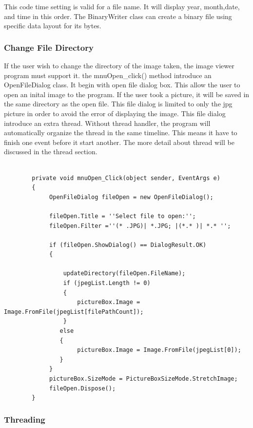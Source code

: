 \documentclass[oneside]{ecsgdp}         %
\begin{document}
            This code time setting is valid for a file name. It will display year, month,date, and time in this order. The BinaryWriter class can create a binary file using specific data layout for its bytes. 

\subsubsection*{Change File Directory}
If the user wish to change the directory of the image taken, the image viewer program must support it. the mnuOpen\_click() method introduce an OpenFileDialog class. It begin with open file dialog box. This allow the user to open an inital image to the program. If the user took a picture, it will be saved in the same directory as the open file. This file dialog is limited to only the jpg picture in order to avoid the error of displaying the image. 
This file dialog introduce an extra thread. Without thread handler, the program will automatically organize the thread in the same timeline. This means it have to finish one event before it start another. The more detail about thread will be discussed in the thread section. 
\begin{lstlisting}[caption={change file directory},label=lst:changeFD]

        private void mnuOpen_Click(object sender, EventArgs e)        
        {        
             OpenFileDialog fileOpen = new OpenFileDialog();      
            
             fileOpen.Title = ''Select file to open:'';   
             fileOpen.Filter =''(* .JPG)| *.JPG; |(*.* )| *.* '';           

             if (fileOpen.ShowDialog() == DialogResult.OK)    
             {
    
                 updateDirectory(fileOpen.FileName);     
                 if (jpegList.Length != 0)     
                 {                    
                     pictureBox.Image = Image.FromFile(jpegList[filePathCount]);       
                 }         
                else       
                {       
                     pictureBox.Image = Image.FromFile(jpegList[0]);        
                }        
             }        
             pictureBox.SizeMode = PictureBoxSizeMode.StretchImage;       
             fileOpen.Dispose();        
        }       
        \end{lstlisting}
\subsubsection*{Threading}
\end{document}
